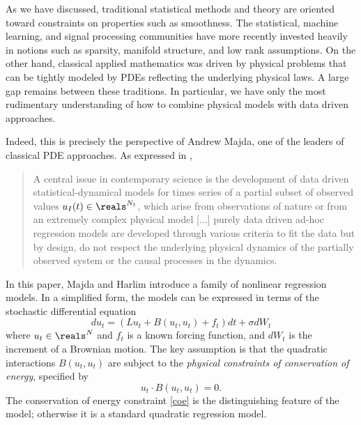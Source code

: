 

\vskip-10pt
\background{}
As we have discussed, traditional statistical methods and theory
are oriented toward constraints on properties
such as smoothness.  The
statistical, machine learning, and signal processing communities have
more recently invested heavily 
in notions such as sparsity, manifold structure, and low rank
assumptions.   On the other hand,
classical applied mathematics was driven
by physical problems that can be tightly modeled by PDEs reflecting the underlying
physical laws.  A large gap remains between these traditions.
In particular, we have only the most rudimentary understanding
of how to combine physical models with data driven approaches.

Indeed, this is precisely the perspective of Andrew Majda,
one of the leaders of classical PDE approaches. As
expressed in \cite{majda:12}, 
\begin{quote}
A central issue in contemporary
science is the development of data driven statistical-dynamical models
for times series of a partial subset of observed values 
$u_I(t)\in\reals^{N_1}$, which arise from observations
of nature or from an extremely complex physical model [$\ldots$]
purely data driven ad-hoc regression models are developed through
various criteria to fit the data but by design, do not respect the
underlying
physical dynamics of the partially observed system or the causal
processes
in the dynamics.
\end{quote}
In this paper, Majda and Harlim introduce a family 
of nonlinear regression models.  In a simplified
form, the models can be expressed in terms
of the stochastic differential equation
$$ du_t = \left(Lu_t + B(u_t, u_t) + f_t\right)dt + \sigma dW_t$$
where $u_t\in\reals^N$ and $f_t$ is a known forcing
function, and $dW_t$ is the increment of a Brownian motion.
The key assumption is that the quadratic interactions $B(u_t, u_t)$ are
subject to the \textit{physical constraints of conservation of
  energy},
specified by 
\begin{equation}
u_t \cdot B(u_t, u_t) = 0.
\label{coe}
\end{equation}
The conservation of energy constraint \eqref{coe} is the 
distinguishing feature of the model; otherwise it is a
standard quadratic regression model.

